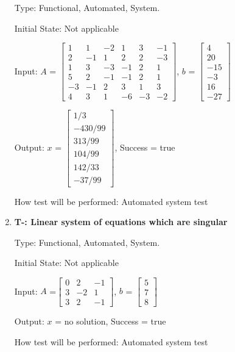 \documentclass[12pt, titlepage]{article}
\newcounter{tnum}
\begin{document}
\begin{enumerate}
Type: Functional, Automated, System.
					
Initial State: Not applicable
					
Input: $A$ = $\begin{bmatrix} 
1 & 1 & -2 & 1 & 3 & -1 \\
2 & -1 & 1 & 2 & 2 & -3 \\
1 & 3 & -3 & -1 & 2 &1 \\
5 & 2 &-1 & -1 & 2 & 1 \\
-3 & -1 & 2 & 3 & 1 &3 \\
4 & 3 & 1 & -6 & -3 & -2
\end{bmatrix}$, $b$  = $\begin{bmatrix} 
 4\\
20\\
-15\\
-3\\
16\\
-27 
\end{bmatrix}$
					
Output: $x$ = $\begin{bmatrix} 
1/3\\
-430/99\\
313/99\\
104/99\\
142/33\\
-37/99 
\end{bmatrix}$, Success = true
					
How test will be performed: Automated system test

\item{\textbf{T-\thetnum \label{t-gaussian
elimination_three}: Linear system of equations which are singular}}

Type: Functional, Automated, System.
					
Initial State: Not applicable
					
Input: $A$ =$\begin{bmatrix} 
0 & 2 & -1 \\
3 & -2 & 1\\
3 & 2 & -1
\end{bmatrix}$, $b$ = $\begin{bmatrix} 
5\\
7\\
8 
\end{bmatrix}$
					
Output: $x$ = no solution, Success = true
					
How test will be performed: Automated system test

\end{enumerate}
\end{document}
